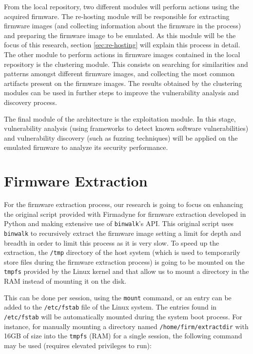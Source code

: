 From the local repository, two different modules will perform actions using the acquired firmware. The re-hosting module will be responsible for extracting firmware images (and collecting information about the firmware in the process) and preparing the firmware image to be emulated. As this module will be the focus of this research, section \ref{sec:re-hosting} will explain this process in detail. The other module to perform actions in firmware images contained in the local repository is the clustering module. This consists on searching for similarities and patterns amongst different firmware images, and collecting the most common artifacts present on the firmware images. The results obtained by the clustering modules can be used in further steps to improve the vulnerability analysis and discovery process.

The final module of the architecture is the exploitation module. In this stage, vulnerability analysis (using frameworks to detect known software vulnerabilities) and vulnerability discovery (such as fuzzing techniques) will be applied on the emulated firmware to analyze its security performance.

\section{Firmware Extraction}
\label{sec:extraction}

For the firmware extraction process, our research is going to focus on enhancing the original script provided with Firmadyne \cite{firmadyne} for firmware extraction developed in Python and making extensive use of {\tt binwalk}'s API. This original script uses {\tt binwalk} to recursively extract the firmware image setting a limit for depth and breadth in order to limit this process as it is very slow. To speed up the extraction, the {\tt /tmp} directory of the host system (which is used to temporarily store files during the firmware extraction process) is going to be mounted on the {\tt tmpfs} provided by the Linux kernel and that allow us to mount a directory in the RAM instead of mounting it on the disk.

This can be done per session, using the {\tt mount} command, or an entry can be added to the {\tt /etc/fstab} file of the Linux system. The entries found in {\tt /etc/fstab} will be automatically mounted during the system boot process. For instance, for manually mounting a directory named {\tt /home/firm/extractdir} with 16GB of size into the {\tt tmpfs} (RAM) for a single session, the following command may be used (requires elevated privileges to run):

